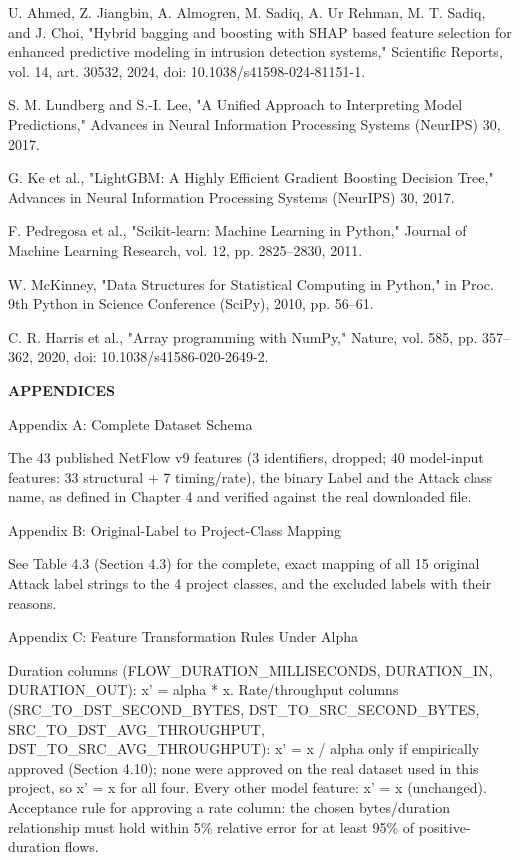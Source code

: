 \documentclass[12pt,a4paper]{report}
\begin{document}
\begin{enumerate}[label={[\arabic*]}]
\item U. Ahmed, Z. Jiangbin, A. Almogren, M. Sadiq, A. Ur Rehman, M. T. Sadiq, and J. Choi, "Hybrid bagging and boosting with SHAP based feature selection for enhanced predictive modeling in intrusion detection systems," Scientific Reports, vol. 14, art. 30532, 2024, doi: 10.1038/s41598-024-81151-1.
\item S. M. Lundberg and S.-I. Lee, "A Unified Approach to Interpreting Model Predictions," Advances in Neural Information Processing Systems (NeurIPS) 30, 2017.
\item G. Ke et al., "LightGBM: A Highly Efficient Gradient Boosting Decision Tree," Advances in Neural Information Processing Systems (NeurIPS) 30, 2017.
\item F. Pedregosa et al., "Scikit-learn: Machine Learning in Python," Journal of Machine Learning Research, vol. 12, pp. 2825--2830, 2011.
\item W. McKinney, "Data Structures for Statistical Computing in Python," in Proc. 9th Python in Science Conference (SciPy), 2010, pp. 56--61.
\item C. R. Harris et al., "Array programming with NumPy," Nature, vol. 585, pp. 357--362, 2020, doi: 10.1038/s41586-020-2649-2.
\end{enumerate}

\begin{center}\textbf{APPENDICES}\end{center}\vspace{4pt}
\begin{center}Appendix A: Complete Dataset Schema\end{center}
The 43 published NetFlow v9 features (3 identifiers, dropped; 40 model-input features: 33 structural + 7 timing/rate), the binary Label and the Attack class name, as defined in Chapter 4 and verified against the real downloaded file.

\begin{center}Appendix B: Original-Label to Project-Class Mapping\end{center}
See Table 4.3 (Section 4.3) for the complete, exact mapping of all 15 original Attack label strings to the 4 project classes, and the excluded labels with their reasons.

\begin{center}Appendix C: Feature Transformation Rules Under Alpha\end{center}
Duration columns (FLOW\_DURATION\_MILLISECONDS, DURATION\_IN, DURATION\_OUT): x' = alpha * x. Rate/throughput columns (SRC\_TO\_DST\_SECOND\_BYTES, DST\_TO\_SRC\_SECOND\_BYTES, SRC\_TO\_DST\_AVG\_THROUGHPUT, DST\_TO\_SRC\_AVG\_THROUGHPUT): x' = x / alpha only if empirically approved (Section 4.10); none were approved on the real dataset used in this project, so x' = x for all four. Every other model feature: x' = x (unchanged). Acceptance rule for approving a rate column: the chosen bytes/duration relationship must hold within 5\% relative error for at least 95\% of positive-duration flows.
\end{document}
